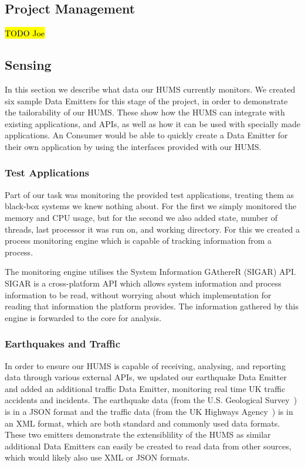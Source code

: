 \documentclass[10pt,a4paper]{article}
\begin{document}
\subsection{Project Management}
\hl{TODO Joe}

\subsection{Sensing}
\label{sec:monitor}
In this section we describe what data our HUMS currently monitors. We created six sample Data Emitters for this stage of the project, in order to demonstrate the tailorability of our HUMS. These show how the HUMS can integrate with existing applications, and APIs, as well as how it can be used with specially made applications. An Consumer would be able to quickly create a Data Emitter for their own application by using the interfaces provided with our HUMS.

\subsubsection{Test Applications} \label{subsec:tapp}
Part of our task was monitoring the provided test applications, treating them as black-box systems we knew nothing about. For the first we simply monitored the memory and CPU usage, but for the second we also added state, number of threads, last processor it was run on, and working directory. For this we created a process monitoring engine which is capable of tracking information from a process.

The monitoring engine utilises the System Information GAthereR (SIGAR) API. SIGAR is a cross-platform API which allows system information and process information to be read, without worrying about which implementation for reading that information the platform provides. The information gathered by this engine is forwarded to the core for analysis.

\subsubsection{Earthquakes and Traffic}
In order to ensure our HUMS is capable of receiving, analysing, and reporting data through various external APIs, we updated our earthquake Data Emitter and added an additional traffic Data Emitter, monitoring real time UK traffic accidents and incidents. The earthquake data (from the U.S. Geological Survey~\cite{us_geo}) is in a JSON format and the traffic data (from the UK Highways Agency~\cite{ha_traffic}) is in an XML format, which are both standard and commonly used data formats. These two emitters demonstrate the extensiblility of the HUMS as similar additional Data Emitters can easily be created to read data from other sources, which would likely also use XML or JSON formats.
\end{document}
